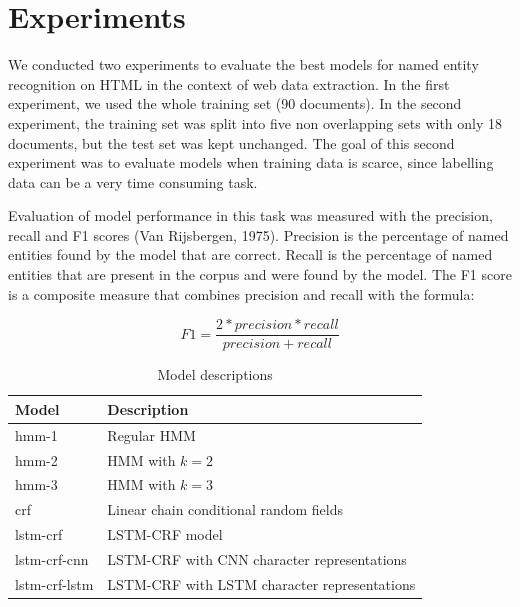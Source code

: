 \documentclass[sigconf]{acmart}
\begin{document}
\section{Experiments}

We conducted two experiments to evaluate the best models for named entity recognition
on HTML in the context of web data extraction. In the first experiment, we used the
whole training set (90 documents). In the second experiment, the training set was split 
into five non overlapping sets with only 18 documents, but the test set was kept unchanged. 
The goal of this second experiment 
was to evaluate models when training data is scarce, since labelling data can be a very 
time consuming task.

Evaluation of model performance in this task was measured with the precision, recall and 
F1 scores (Van Rijsbergen, 1975). Precision is the percentage of named entities found by 
the model that are correct. Recall is the percentage of named entities that are present
in the corpus and were found by the model. The F1 score is a composite measure that combines
precision and recall with the formula:

\begin{equation}
F1 = \frac{2 * precision * recall}{precision + recall}
\end{equation}

\begin{table}[h]
  \small
  \begin{center}
    \begin{tabular}{ |l|l| }
      \hline
      Model & Description \\
      \hline
      hmm-1         & Regular HMM \\
      hmm-2         & HMM with $ k=2 $ \\
      hmm-3         & HMM with $ k=3 $ \\
      crf           & Linear chain conditional random fields \\
      lstm-crf      & LSTM-CRF model \cite{Huang2015} \\
      lstm-crf-cnn  & LSTM-CRF with CNN character representations \cite{Ma2016} \\
      lstm-crf-lstm & LSTM-CRF with LSTM character representations \cite{Lample2016} \\
      \hline
    \end{tabular}
  \end{center}
  \caption{Model descriptions}
  \label{tab:models}
\end{table}
\end{document}
